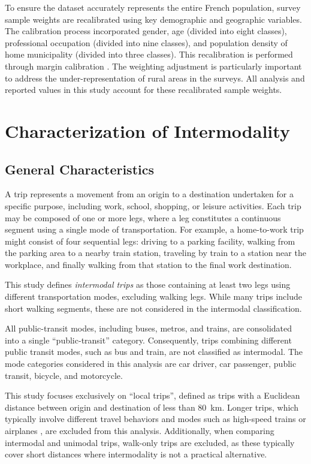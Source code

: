 \documentclass[3p,times,procedia]{elsarticle}
\begin{document}
To ensure the dataset accurately represents the entire French population, survey sample weights are recalibrated using key demographic and geographic variables.
The calibration process incorporated gender, age (divided into eight classes), professional occupation (divided into nine classes), and population density of home municipality (divided into three classes).
This recalibration is performed through margin calibration \citep{Deville1992,Icarus}.
The weighting adjustment is particularly important to address the under-representation of rural areas in the surveys.
All analysis and reported values in this study account for these recalibrated sample weights.


\section{Characterization of Intermodality}

\subsection{General Characteristics}

A trip represents a movement from an origin to a destination undertaken for a specific purpose, including work, school, shopping, or leisure activities.
Each trip may be composed of one or more legs, where a leg constitutes a continuous segment using a single mode of transportation.
For example, a home-to-work trip might consist of four sequential legs: driving to a parking facility, walking from the parking area to a nearby train station, traveling by train to a station near the workplace, and finally walking from that station to the final work destination.

This study defines \emph{intermodal trips} as those containing at least two legs using different transportation modes, excluding walking legs.
While many trips include short walking segments, these are not considered in the intermodal classification.

All public-transit modes, including buses, metros, and trains, are consolidated into a single ``public-transit'' category.
Consequently, trips combining different public transit modes, such as bus and train, are not classified as intermodal.
The mode categories considered in this analysis are car driver, car passenger, public transit, bicycle, and motorcycle.

This study focuses exclusively on ``local trips'', defined as trips with a Euclidean distance between origin and destination of less than \SI{80}{\kilo\meter}.
Longer trips, which typically involve different travel behaviors and modes such as high-speed trains or airplanes \citep{Tan2022}, are excluded from this analysis.
Additionally, when comparing intermodal and unimodal trips, walk-only trips are excluded, as these typically cover short distances where intermodality is not a practical alternative.
\end{document}
